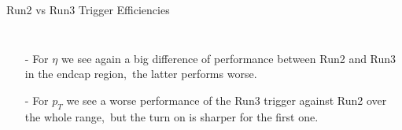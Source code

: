 \documentclass[aspectratio=1610,8pt]{beamer}					%
\begin{document}
\begin{frame}{Run2 vs Run3 Trigger Efficiencies}
\begin{columns}
        \begin{itemize}
            \item [-]
                For $ \eta$ we see again a big difference of performance between Run2 and Run3 in the endcap region,\
                the latter performs worse.
            \item [-]
                For $p_T$ we see a worse performance of the Run3 trigger against Run2 over the whole range,\
                but the turn on is sharper for the first one.
        \end{itemize}
    \end{columns}

\end{frame}
\end{document}
